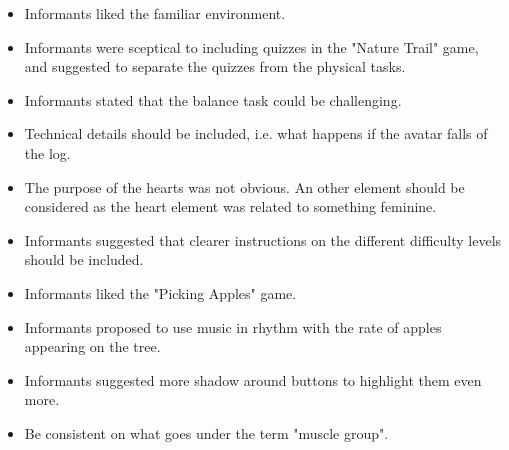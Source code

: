 \begin{itemize}
\item Informants liked the familiar environment.
\item Informants were sceptical to including quizzes in the "Nature Trail" game, and suggested to separate the quizzes from the physical tasks.
\item Informants stated that the balance task could be challenging.
\item Technical details should be included, i.e. what happens if the avatar falls of the log.
\item The purpose of the hearts was not obvious. An other element should be considered as the heart element was related to something feminine.
\item Informants suggested that clearer instructions on the different difficulty levels should be included.
\item Informants liked the "Picking Apples" game. 
\item Informants proposed to use music in rhythm with the rate of apples appearing on the tree. 
\item Informants suggested more shadow around buttons to highlight them even more.
\item Be consistent on what goes under the term "muscle group".

\end{itemize}



